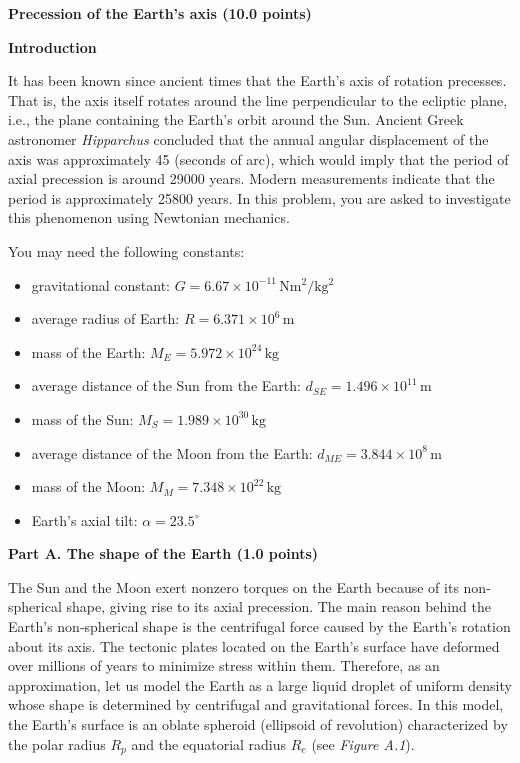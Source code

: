 {\large\textbf{Precession of the Earth's axis (10.0 points)}}

\textbf{Introduction}

It has been known since ancient times that the Earth's axis of rotation
precesses. That is, the axis itself rotates around the line perpendicular to
the ecliptic plane, i.e., the plane containing the Earth's orbit around the
Sun. Ancient Greek astronomer \textit{Hipparchus} concluded that the annual
angular displacement of the axis was approximately
45\textquotesingle\textquotesingle{} (seconds of arc), which would imply that
the period of axial precession is around 29000 years. Modern measurements
indicate that the period is approximately 25800 years. In this problem, you are
asked to investigate this phenomenon using Newtonian mechanics.

You may need the following constants:

\begin{itemize}
\item gravitational constant: $G = 6.67 \times 10^{-11}\,\mathrm{Nm^2/kg^2}$
\item average radius of Earth: $R = 6.371 \times 10^{6}\,\mathrm{m}$
\item mass of the Earth: $M_E = 5.972 \times 10^{24}\,\mathrm{kg}$
\item average distance of the Sun from the Earth: $d_{SE} = 1.496 \times 10^{11}\,\mathrm{m}$
\item mass of the Sun: $M_S = 1.989 \times 10^{30}\,\mathrm{kg}$
\item average distance of the Moon from the Earth: $d_{ME} = 3.844 \times 10^{8}\,\mathrm{m}$
\item mass of the Moon: $M_M = 7.348 \times 10^{22}\,\mathrm{kg}$
\item Earth's axial tilt: $\alpha = 23.5^\circ$
\end{itemize}

\textbf{Part A. The shape of the Earth (1.0 points)}

The Sun and the Moon exert nonzero torques on the Earth because of its
non-spherical shape, giving rise to its axial precession. The main reason
behind the Earth's non-spherical shape is the centrifugal force caused by the
Earth's rotation about its axis. The tectonic plates located on the Earth's
surface have deformed over millions of years to minimize stress within them.
Therefore, as an approximation, let us model the Earth as a large liquid
droplet of uniform density whose shape is determined by centrifugal and
gravitational forces. In this model, the Earth's surface is an oblate spheroid
(ellipsoid of revolution) characterized by the polar radius $R_p$ and the
equatorial radius $R_e$ (see \textit{Figure A.1}).

